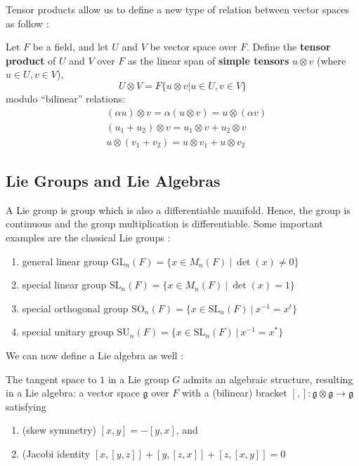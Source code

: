 \documentclass[11pt, reqno]{amsart}
\theoremstyle{plain}
\theoremstyle{definition}
\theoremstyle{example}
\def\GL{\mathrm{GL}} \def\SL{\mathrm{SL}} \def\SO{\mathrm{SO}} \def\SU{\mathrm{SU}}  \def\SP{\mathrm{SL}}
\begin{document}
Tensor products allow us to define a new type of relation between vector spaces as follow \cite[Lec. 21, p. 2]{dau}:

\par
Let $F$ be a field, and let $U$ and $V$ be vector space over $F$. Define the \textbf{tensor product} of $U$ and $V$ over $F$ as the linear span of \textbf{simple tensors} $u \otimes v$ (where $u \in U, v \in V$), $$U \otimes V = F\{u \otimes v | u\in U, v \in V\}$$ modulo ``bilinear'' relations:
\begin{align*}
&(\alpha u) \otimes v = \alpha (u \otimes v) = u \otimes (\alpha v)\\
&(u_1 + u_2) \otimes v = u_1 \otimes v + u_2 \otimes v\\
&u \otimes (v_1 + v_2) = u \otimes v_1 + u \otimes v_2
\end{align*}

\subsection{Lie Groups and Lie Algebras}

A Lie group is group which is also a differentiable manifold. Hence, the group is continuous and the group multiplication is differentiable. Some important examples are the classical Lie groups \cite[Lec 22, p. 1]{dau}:
\begin{enumerate}
\item general linear group $\GL_n(F) = \{x \in M_n(F) \ | \ \det(x) \neq 0\}$
\item special linear group $\SL_n(F) = \{x \in M_n(F) \ | \ \det(x) = 1\}$
\item special orthogonal group $\SO_n(F) = \{x \in \SL_n(F) \ | \ x^{-1} = x^t\}$
\item special unitary group $\SU_n(F) = \{x \in \SL_n(F) \ | \ x^{-1} = x^*\}$
\end{enumerate}

We can now define a Lie algebra as well  \cite[Lec 22, p. 2]{dau}:

\par
The tangent space to $1$ in a Lie group $G$ admits an algebraic structure, resulting in a Lie algebra: a vector space $\mathfrak{g}$ over $F$ with a (bilinear) bracket $[,] : \mathfrak{g} \otimes \mathfrak{g} \to \mathfrak{g}$ satisfying
\begin{enumerate}[label=\alph*)]
\item (skew symmetry) $[x, y] = -[y, x]$, and
\item (Jacobi identity $[x, [y, z]] + [y,[z,x]] + [z,[x,y]] = 0$
\end{enumerate}
\end{document}
